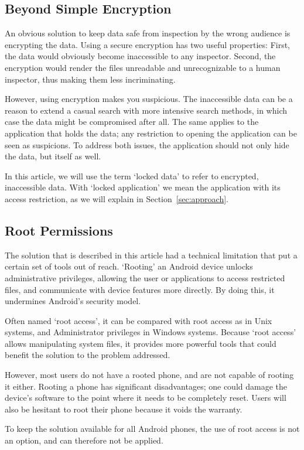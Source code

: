 \subsection{Beyond Simple Encryption}
An obvious solution to keep data safe from inspection by the wrong audience is encrypting the data.
Using a secure encryption has two useful properties:
First, the data would obviously become inaccessible to any inspector.
Second, the encryption would render the files unreadable and unrecognizable to a human inspector, thus making them less incriminating.

However, using encryption makes you suspicious.
The inaccessible data can be a reason to extend a casual search with more intensive search methods, in which case the data might be compromised after all.
The same applies to the application that holds the data; any restriction to opening the application can be seen as suspicions.
To address both issues, the application should not only hide the data, but itself as well.

In this article, we will use the term `locked data' to refer to encrypted, inaccessible data.
With `locked application' we mean the application with its access restriction, as we will explain in Section~\ref{sec:approach}.

\subsection{Root Permissions}
The solution that is described in this article had a technical limitation that put a certain set of tools out of reach.
`Rooting' an Android device unlocks administrative privileges, allowing the user or applications to access restricted files, and communicate with device features more directly.
By doing this, it undermines Android's security model\cite{vidas2011all}.

Often named `root access', it can be compared with root access as in Unix systems, and Administrator privileges in Windows systems.
Because `root access' allows manipulating system files, it provides more powerful tools that could benefit the solution to the problem addressed.

However, most users do not have a rooted phone, and are not capable of rooting it either. 
Rooting a phone has significant disadvantages; one could damage the device's software to the point where it needs to be completely reset.
Users will also be hesitant to root their phone because it voids the warranty.

To keep the solution available for all Android phones, the use of root access is not an option, and can therefore not be applied.


